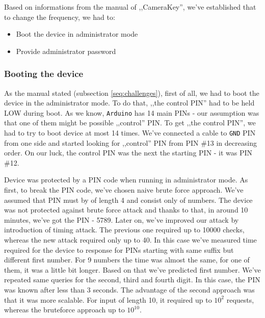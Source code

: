 Based on informations from the manual of ,,CameraKey'', we've established that to change the frequency, we had to:

\begin{itemize}
  \item Boot the device in administrator mode
  \item Provide administrator password
\end{itemize}

\subsubsection{Booting the device}

As the manual stated (subsection \ref{seq:challenges}), first of all, we had to boot the device in the administrator mode. To do that, ,,the control PIN'' had to be held LOW during boot. As we know, \texttt{Arduino} has 14 main PINs - our assumption was that one of them might be possible ,,control'' PIN.  To get ,,the control PIN'', we had to try to boot device at most 14 times. We've connected a cable to \texttt{GND} PIN from one side and started looking for ,,control'' PIN from PIN \#13 in decreasing order. On our luck, the control PIN was the next the starting PIN - it was PIN \#12.

Device was protected by a PIN code when running in administrator mode. As first, to break the PIN code, we've chosen naive brute force approach. We've assumed that PIN must by of length 4 and consist only of numbers. The device was not protected against brute force attack and thanks to that, in around 10 minutes, we've got the PIN - 5789. Later on, we've improved our attack by introduction of timing attack. The previous one required up to 10000 checks, whereas the new attack required only up to 40. In this case we've measured time required for the device to response for PINs starting with same suffix but different first number. For 9 numbers the time was almost the same, for one of them, it was a little bit longer. Based on that we've predicted first number. We've repeated same queries for the second, third and fourth digit. In this case, the PIN was known after less than 3 seconds. The advantage of the second approach was that it was more scalable. For input of length 10, it required up to $10^2$ requests, whereas the bruteforce approach up to $10 ^ {10}$.


